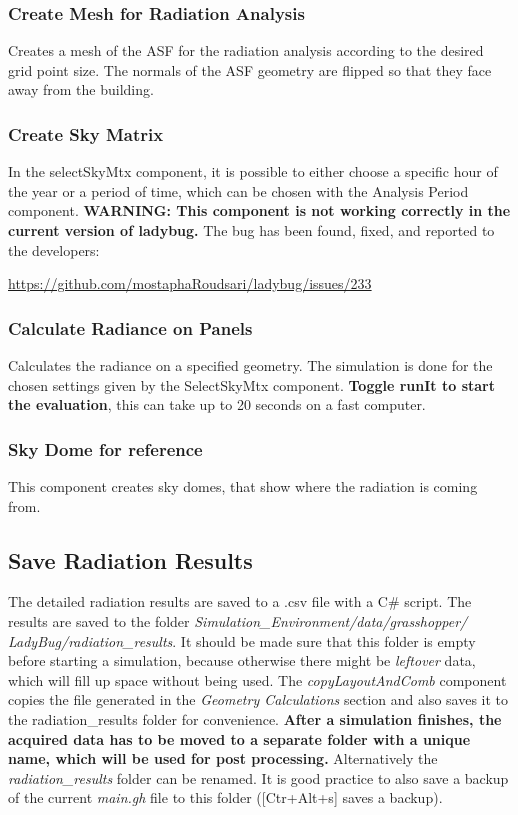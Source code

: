 		\subsubsection{Create Mesh for Radiation Analysis}
		Creates a mesh of the ASF for the radiation analysis according to the desired grid point size. The normals of the ASF geometry are flipped so that they face away from the building. 

		\subsubsection{Create Sky Matrix}
		In the selectSkyMtx component, it is possible to either choose a specific hour of the year or a period of time, which can be chosen with the Analysis Period component. {\bf WARNING: This component is not working correctly in the current version of ladybug.} The bug has been found, fixed, and reported to the developers:

		\url{https://github.com/mostaphaRoudsari/ladybug/issues/233}

		\subsubsection{Calculate Radiance on Panels}
		Calculates the radiance on a specified geometry. The simulation is done for the chosen settings given by the SelectSkyMtx component. {\bf Toggle runIt to start the evaluation}, this can take up to 20 seconds on a fast computer. 

		\subsubsection{Sky Dome for reference}
		This component creates sky domes, that show where the radiation is coming from. 



	\subsection{Save Radiation Results}
	The detailed radiation results are saved to a .csv file with a C\# script. The results are saved to the folder \emph{Simulation\_Environment/data/grasshopper/ LadyBug/radiation\_results}. It should be made sure that this folder is empty before starting a simulation, because otherwise there might be \emph{leftover} data, which will fill up space without being used. The \emph{copyLayoutAndComb} component copies the file generated in the \emph{Geometry Calculations} section and also saves it to the radiation\_results folder for convenience. {\bf After a simulation finishes, the acquired data has to be moved to a separate folder with a unique name, which will be used for post processing.} Alternatively the \emph{radiation\_results} folder can be renamed. It is good practice to also save a backup of the current \emph{main.gh} file to this folder ([Ctr+Alt+s] saves a backup). 


